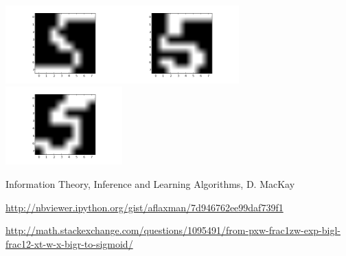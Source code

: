 \documentclass[12pt,fleqn]{article}\usepackage{../common}
\begin{document}
\includegraphics[height=3cm]{boltzmann_01.png}\includegraphics[height=3cm]{boltzmann_02.png}\includegraphics[height=3cm]{boltzmann_03.png}











Information Theory, Inference and Learning Algorithms, D. MacKay

\url{http://nbviewer.ipython.org/gist/aflaxman/7d946762ee99daf739f1}

\url{http://math.stackexchange.com/questions/1095491/from-pxw-frac1zw-exp-bigl-frac12-xt-w-x-bigr-to-sigmoid/}
\end{document}
